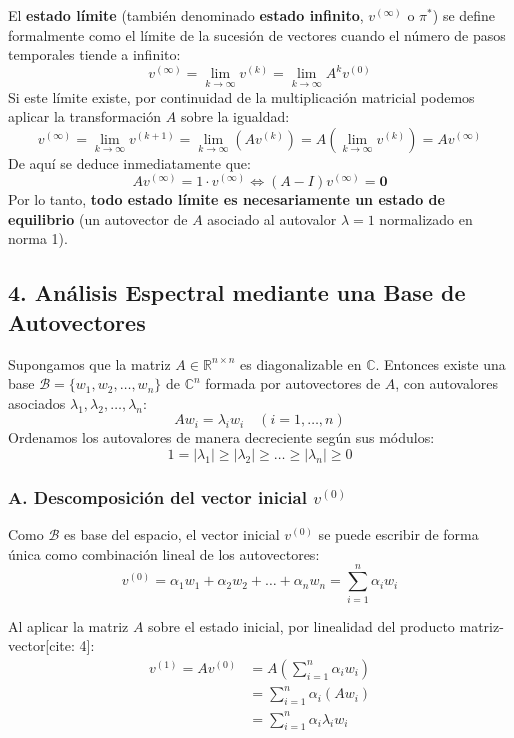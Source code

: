 \documentclass[11pt,a4paper]{article}
\theoremstyle{definition}
\begin{document}
El \textbf{estado límite} (también denominado \textbf{estado infinito}, $v^{(\infty)}$ o $\pi^*$) se define formalmente como el límite de la sucesión de vectores cuando el número de pasos temporales tiende a infinito:
\[
v^{(\infty)} = \lim_{k \to \infty} v^{(k)} = \lim_{k \to \infty} A^k v^{(0)}
\]
Si este límite existe, por continuidad de la multiplicación matricial podemos aplicar la transformación $A$ sobre la igualdad:
\[
v^{(\infty)} = \lim_{k \to \infty} v^{(k+1)} = \lim_{k \to \infty} \left( A v^{(k)} \right) = A \left( \lim_{k \to \infty} v^{(k)} \right) = A v^{(\infty)}
\]
De aquí se deduce inmediatamente que:
\[
A v^{(\infty)} = 1 \cdot v^{(\infty)} \iff (A - I) v^{(\infty)} = \mathbf{0}
\]
Por lo tanto, \textbf{todo estado límite es necesariamente un estado de equilibrio} (un autovector de $A$ asociado al autovalor $\lambda = 1$ normalizado en norma 1).

\subsection*{4. Análisis Espectral mediante una Base de Autovectores}

Supongamos que la matriz $A \in \mathbb{R}^{n \times n}$ es diagonalizable en $\mathbb{C}$. Entonces existe una base $\mathcal{B} = \{w_1, w_2, \dots, w_n\}$ de $\mathbb{C}^n$ formada por autovectores de $A$, con autovalores asociados $\lambda_1, \lambda_2, \dots, \lambda_n$:
\[
A w_i = \lambda_i w_i \quad (i = 1, \dots, n)
\]
Ordenamos los autovalores de manera decreciente según sus módulos:
\[
1 = |\lambda_1| \ge |\lambda_2| \ge \dots \ge |\lambda_n| \ge 0
\]

\subsubsection*{A. Descomposición del vector inicial $v^{(0)}$}
Como $\mathcal{B}$ es base del espacio, el vector inicial $v^{(0)}$ se puede escribir de forma única como combinación lineal de los autovectores:
\[
v^{(0)} = \alpha_1 w_1 + \alpha_2 w_2 + \dots + \alpha_n w_n = \sum_{i=1}^n \alpha_i w_i
\]

Al aplicar la matriz $A$ sobre el estado inicial, por linealidad del producto matriz-vector[cite: 4]:
\begin{align*}
    v^{(1)} = A v^{(0)} &= A \left( \sum_{i=1}^n \alpha_i w_i \right) \\
    &= \sum_{i=1}^n \alpha_i (A w_i) \\
    &= \sum_{i=1}^n \alpha_i \lambda_i w_i
\end{align*}
\end{document}
